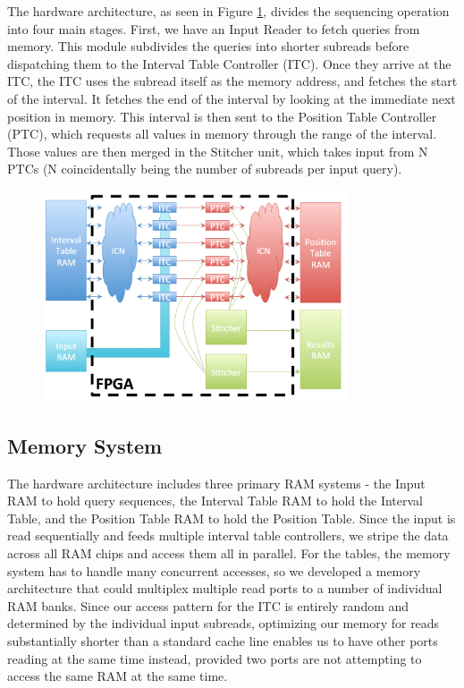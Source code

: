 \documentclass[11pt]{article}
\begin{document}
The hardware architecture, as seen in Figure \ref{arch}, divides the sequencing operation into four main stages.  First, we have an Input Reader to fetch queries from memory.  This module subdivides the queries into shorter subreads before dispatching them to the Interval Table Controller (ITC).  Once they arrive at the ITC, the ITC uses the subread itself as the memory address, and fetches the start of the interval.  It fetches the end of the interval by looking at the immediate next position in memory.  This interval is then sent to the Position Table Controller (PTC), which requests all values in memory through the range of the interval.  Those values are then merged in the Stitcher unit, which takes input from N PTCs (N coincidentally being the number of subreads per input query).
\begin{figure}[ht!]
\centering
\includegraphics[width=90mm]{architecture.png}
\caption{}
\label{arch}
\end{figure}


\subsection{Memory System}
The hardware architecture includes three primary RAM systems - the Input RAM to hold query sequences, the Interval Table RAM to hold the Interval Table, and the Position Table RAM to hold the Position Table.  Since the input is read sequentially and feeds multiple interval table controllers, we  stripe the data across all RAM chips and access them all in parallel.  For the tables, the memory system has to handle many concurrent accesses, so we developed a memory architecture that could multiplex multiple read ports to a number of individual RAM banks.  Since our access pattern for the ITC is entirely random and determined by the individual input subreads, optimizing our memory for reads substantially shorter than a standard cache line enables us to have other ports reading at the same time instead, provided two ports are not attempting to access the same RAM at the same time.
\end{document}
